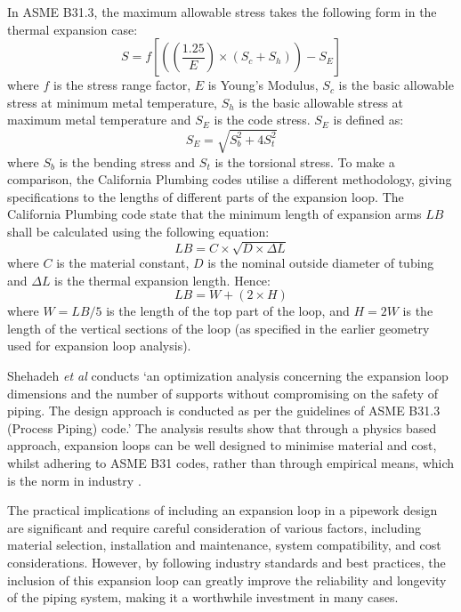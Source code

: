 In ASME B31.3, the maximum allowable stress takes the following form in the thermal expansion case:
\begin{equation}
    S = f\left[\left(\left(\frac{1.25}{E}\right)\times \left(S_c + S_h\right)\right)- S_E\right]
\end{equation}
where $f$ is the stress range factor, $E$ is Young's Modulus, $S_c$ is the basic allowable stress at minimum metal temperature, $S_h$ is the basic allowable stress at maximum metal temperature and $S_E$ is the code stress. $S_E$ is defined as:
\begin{equation}
    S_E = \sqrt{S^2_b + 4S_t^2}
\end{equation}
where $S_b$ is the bending stress and $S_t$ is the torsional stress. To make a comparison, the California Plumbing codes utilise a different methodology, giving specifications to the lengths of different parts of the expansion loop. The California Plumbing code state that the minimum length of expansion arms $LB$ shall be calculated using the following equation:
\begin{equation}
    LB = C\times \sqrt{D \times \Delta L}
\end{equation}
where $C$ is the material constant, $D$ is the nominal outside diameter of tubing and $\Delta L$ is the thermal expansion length. Hence:
\begin{equation}
    LB = W + \left(2\times H\right)
\end{equation}
where $W = LB/5$ is the length of the top part of the loop, and $H = 2W$ is the length of the vertical sections of the loop (as specified in the earlier geometry used for expansion loop analysis).

Shehadeh \textit{et al} conducts `an optimization analysis concerning the expansion loop dimensions and the number of supports without compromising on the safety of piping. The design approach is conducted as per the guidelines of ASME B31.3 (Process Piping) code.' The analysis results show that through a physics based approach, expansion loops can be well designed to minimise material and cost, whilst adhering to ASME B31 codes, rather than through empirical means, which is the norm in industry \cite{Shehadeh}.

The practical implications of including an expansion loop in a pipework design are significant and require careful consideration of various factors, including material selection, installation and maintenance, system compatibility, and cost considerations. However, by following industry standards and best practices, the inclusion of this expansion loop can greatly improve the reliability and longevity of the piping system, making it a worthwhile investment in many cases.
